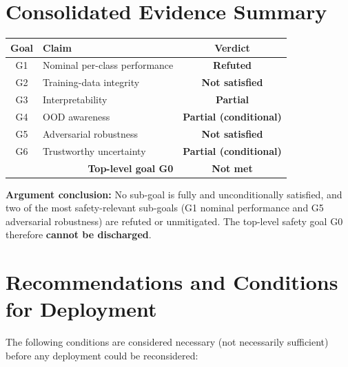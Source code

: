 \documentclass[11pt,a4paper]{article}
\newcommand{\claim}[2]{\vspace{2pt}\noindent\textbf{\color{claimblue}#1:} #2\par\vspace{2pt}}
\begin{document}
\section{Consolidated Evidence Summary}
\begin{center}
\begin{tabular}{clc}
\toprule
\textbf{Goal} & \textbf{Claim} & \textbf{Verdict} \\
\midrule
G1 & Nominal per-class performance      & \textcolor{warnred}{\textbf{Refuted}} \\
G2 & Training-data integrity            & \textcolor{warnred}{\textbf{Not satisfied}} \\
G3 & Interpretability                   & \textcolor{orange!80!black}{\textbf{Partial}} \\
G4 & OOD awareness                      & \textcolor{orange!80!black}{\textbf{Partial (conditional)}} \\
G5 & Adversarial robustness             & \textcolor{warnred}{\textbf{Not satisfied}} \\
G6 & Trustworthy uncertainty            & \textcolor{orange!80!black}{\textbf{Partial (conditional)}} \\
\midrule
\multicolumn{2}{r}{\textbf{Top-level goal G0}} & \textcolor{warnred}{\textbf{Not met}} \\
\bottomrule
\end{tabular}
\end{center}

\claim{Argument conclusion}{No sub-goal is fully and unconditionally satisfied,
and two of the most safety-relevant sub-goals (G1 nominal performance and G5
adversarial robustness) are refuted or unmitigated. The top-level safety goal G0
therefore \textbf{cannot be discharged}.}

\section{Recommendations and Conditions for Deployment}
\label{sec:recommendations}
The following conditions are considered necessary (not necessarily sufficient)
before any deployment could be reconsidered:
\end{document}
